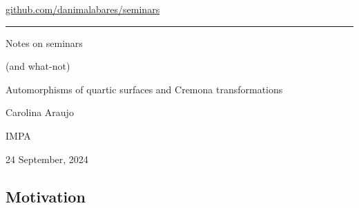 


\begin{minipage}{\textwidth}
	\begin{minipage}{1\textwidth}
		 \hfill 		
		{\small\hfill\href{https://github.com/danimalabares/seminars}{github.com/danimalabares/seminars}}

		
	\end{minipage}
\end{minipage}\vspace{.2cm}\hrule

\vspace{10pt}
{\Huge Notes on seminars}

{\large (and what-not)}

\tableofcontents

\clearpage
{}
{\Huge Automorphisms of quartic surfaces and Cremona transformations}

\hfill{\Large Carolina Araujo}

{\Large \hfill IMPA}

\hfill{\large 24 September, 2024}
\iffalse
\phantomsection\stepcounter{section}\addcontentsline{toc}{section}{\thesection\quad 
Automorphisms of quartic surfaces and Cremona transformations}\addtocontents{toc}{\hspace{1em}\textit{Carolina Araujo}\par}
{\Huge Automorphisms of quartic surfaces and Cremona transformations}

\hfill{\Large Carolina Araujo}
{\Large \hfill IMPA}

\hfill{\large September 24, 2024}
\fi

\subsection{Motivation}

